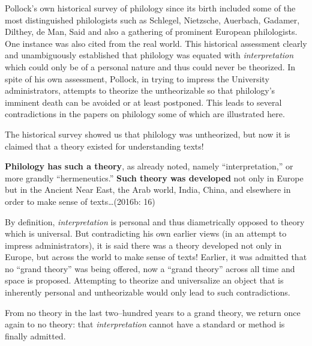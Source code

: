 Pollock’s own historical survey of philology since its birth included some of the most distinguished philologists such as Schlegel, Nietzsche, Auerbach, Gadamer, Dilthey, de Man, Said and also a gathering of prominent European philologists. One instance was also cited from the real world. This historical assessment clearly and unambiguously established that philology was equated with \textit{interpretation} which could only be of a personal nature and thus could never be theorized. In spite of his own assessment, Pollock, in trying to impress the University administrators, attempts to theorize the untheorizable so that philology’s imminent death can be avoided or at least postponed. This leads to several contradictions in the papers on philology some of which are illustrated here.

The historical survey showed us that philology was untheorized, but now it is claimed that a theory existed for understanding texts!

\begin{myquote}
\textbf{Philology has such a theory}, as already noted, namely “interpretation,” or more grandly “hermeneutics.” \textbf{Such theory was developed} not only in Europe but in the Ancient Near East, the Arab world, India, China, and elsewhere in order to make sense of texts…(2016b: 16)
\end{myquote}

\newpage

By definition, \textit{interpretation} is personal and thus diametrically opposed to theory which is universal. But contradicting his own earlier views (in an attempt to impress administrators), it is said there was a theory developed not only in Europe, but across the world to make sense of texts! Earlier, it was admitted that no “grand theory” was being offered, now a “grand theory” across all time and space is proposed. Attempting to theorize and universalize an object that is inherently personal and untheorizable would only lead to such contradictions.

From no theory in the last two–hundred years to a grand theory, we return once again to no theory: that \textit{interpretation} cannot have a standard or method is finally admitted.

